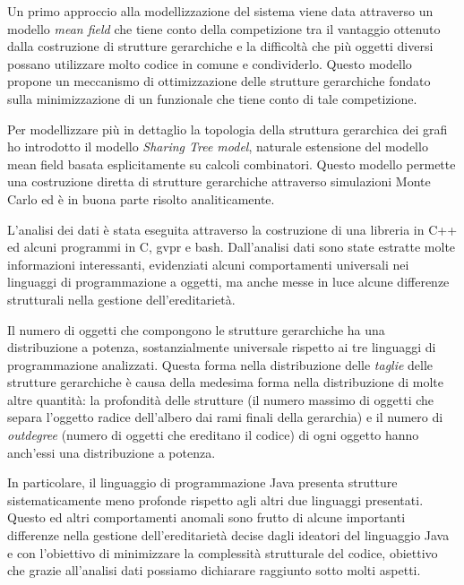 \documentclass[12pt, a4paper, oneside]{book}
\begin{document}
Un primo approccio alla modellizzazione del sistema viene data attraverso un modello \textit{mean field} che tiene conto della competizione tra il vantaggio ottenuto dalla costruzione di strutture gerarchiche e la difficoltà che più oggetti diversi possano utilizzare molto codice in comune e condividerlo. %
Questo modello propone un meccanismo di ottimizzazione delle strutture gerarchiche fondato sulla minimizzazione di un funzionale che tiene conto di tale competizione.

Per modellizzare più in dettaglio la topologia della struttura gerarchica dei grafi ho introdotto il modello \textit{Sharing Tree model}, naturale estensione del modello mean field basata esplicitamente su calcoli combinatori. Questo modello permette una costruzione diretta di strutture gerarchiche attraverso simulazioni Monte Carlo ed è in buona parte risolto analiticamente.

\vspace{0.3cm}
L'analisi dei dati è stata eseguita attraverso la costruzione di una libreria in C++ ed alcuni programmi in C, gvpr e bash. Dall'analisi dati sono state estratte molte informazioni interessanti, evidenziati alcuni comportamenti universali nei linguaggi di programmazione a oggetti, ma anche messe in luce alcune differenze strutturali nella gestione dell'ereditarietà. 

Il numero di oggetti che compongono le strutture gerarchiche ha una distribuzione a potenza, sostanzialmente universale rispetto ai tre linguaggi di programmazione analizzati. Questa forma nella distribuzione delle \textit{taglie} delle strutture gerarchiche è causa della medesima forma nella distribuzione di molte altre quantità: la profondità delle strutture (il numero massimo di oggetti che separa l'oggetto radice dell'albero dai rami finali della gerarchia) e il numero di \textit{outdegree} (numero di oggetti che ereditano il codice) di ogni oggetto hanno anch'essi una distribuzione a potenza.

In particolare, il linguaggio di programmazione Java presenta strutture sistematicamente meno profonde rispetto agli altri due linguaggi presentati. Questo ed altri comportamenti anomali sono frutto di alcune importanti differenze nella gestione dell'ereditarietà decise dagli ideatori del linguaggio Java e con l'obiettivo di minimizzare la complessità strutturale del codice, obiettivo che grazie all'analisi dati possiamo dichiarare raggiunto sotto molti aspetti.
\end{document}
